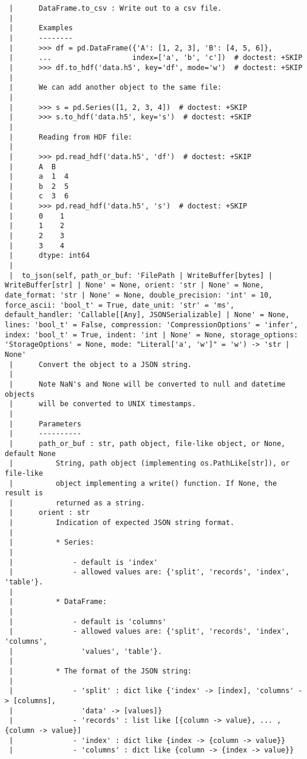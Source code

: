 \documentclass[
  letterpaper,
  DIV=11,
  numbers=noendperiod]{scrreprt}
\begin{document}
\begin{verbatim}
 |      DataFrame.to_csv : Write out to a csv file.
 |      
 |      Examples
 |      --------
 |      >>> df = pd.DataFrame({'A': [1, 2, 3], 'B': [4, 5, 6]},
 |      ...                   index=['a', 'b', 'c'])  # doctest: +SKIP
 |      >>> df.to_hdf('data.h5', key='df', mode='w')  # doctest: +SKIP
 |      
 |      We can add another object to the same file:
 |      
 |      >>> s = pd.Series([1, 2, 3, 4])  # doctest: +SKIP
 |      >>> s.to_hdf('data.h5', key='s')  # doctest: +SKIP
 |      
 |      Reading from HDF file:
 |      
 |      >>> pd.read_hdf('data.h5', 'df')  # doctest: +SKIP
 |      A  B
 |      a  1  4
 |      b  2  5
 |      c  3  6
 |      >>> pd.read_hdf('data.h5', 's')  # doctest: +SKIP
 |      0    1
 |      1    2
 |      2    3
 |      3    4
 |      dtype: int64
 |  
 |  to_json(self, path_or_buf: 'FilePath | WriteBuffer[bytes] | WriteBuffer[str] | None' = None, orient: 'str | None' = None, date_format: 'str | None' = None, double_precision: 'int' = 10, force_ascii: 'bool_t' = True, date_unit: 'str' = 'ms', default_handler: 'Callable[[Any], JSONSerializable] | None' = None, lines: 'bool_t' = False, compression: 'CompressionOptions' = 'infer', index: 'bool_t' = True, indent: 'int | None' = None, storage_options: 'StorageOptions' = None, mode: "Literal['a', 'w']" = 'w') -> 'str | None'
 |      Convert the object to a JSON string.
 |      
 |      Note NaN's and None will be converted to null and datetime objects
 |      will be converted to UNIX timestamps.
 |      
 |      Parameters
 |      ----------
 |      path_or_buf : str, path object, file-like object, or None, default None
 |          String, path object (implementing os.PathLike[str]), or file-like
 |          object implementing a write() function. If None, the result is
 |          returned as a string.
 |      orient : str
 |          Indication of expected JSON string format.
 |      
 |          * Series:
 |      
 |              - default is 'index'
 |              - allowed values are: {'split', 'records', 'index', 'table'}.
 |      
 |          * DataFrame:
 |      
 |              - default is 'columns'
 |              - allowed values are: {'split', 'records', 'index', 'columns',
 |                'values', 'table'}.
 |      
 |          * The format of the JSON string:
 |      
 |              - 'split' : dict like {'index' -> [index], 'columns' -> [columns],
 |                'data' -> [values]}
 |              - 'records' : list like [{column -> value}, ... , {column -> value}]
 |              - 'index' : dict like {index -> {column -> value}}
 |              - 'columns' : dict like {column -> {index -> value}}

\end{verbatim}
\end{document}
